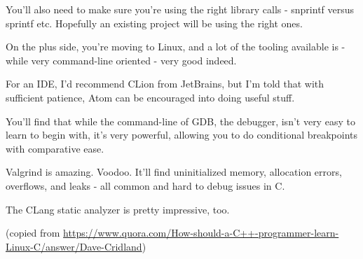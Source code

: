 You’ll also need to make sure you’re using the right library calls - snprintf versus sprintf etc. Hopefully an existing project will be using the right ones.

On the plus side, you’re moving to Linux, and a lot of the tooling available is - while very command-line oriented - very good indeed.

For an IDE, I’d recommend CLion from JetBrains, but I’m told that with sufficient patience, Atom can be encouraged into doing useful stuff.

You’ll find that while the command-line of GDB, the debugger, isn’t very easy to learn to begin with, it’s very powerful, allowing you to do conditional breakpoints with comparative ease.

Valgrind is amazing. Voodoo. It’ll find uninitialized memory, allocation errors, overflows, and leaks - all common and hard to debug issues in C.

The CLang static analyzer is pretty impressive, too.

(copied from
\url{https://www.quora.com/How-should-a-C++-programmer-learn-Linux-C/answer/Dave-Cridland})
